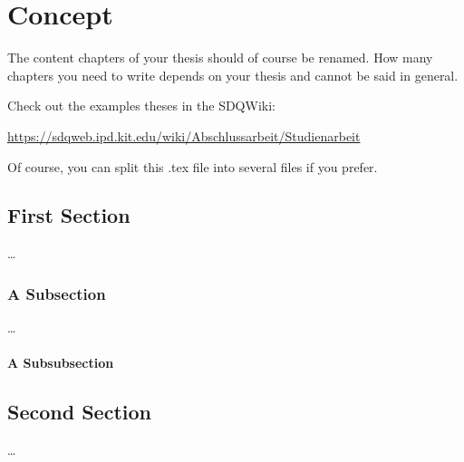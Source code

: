\chapter{Concept}
\label{ch:Concept}

The content chapters of your thesis should of course be renamed. How many
chapters you need to write depends on your thesis and cannot be said in general.

Check out the examples theses in the SDQWiki:

\url{https://sdqweb.ipd.kit.edu/wiki/Abschlussarbeit/Studienarbeit}

Of course, you can split this .tex file into several files if you prefer. 


\section{First Section}
\label{sec:Concept:FirstSection}

\dots

\subsection{A Subsection}
\label{sec:Concept:FirstSubSection}

\dots

\subsubsection{A Subsubsection}

\section{Second Section}
\label{sec:Concept:SecondSection}

\dots
 
